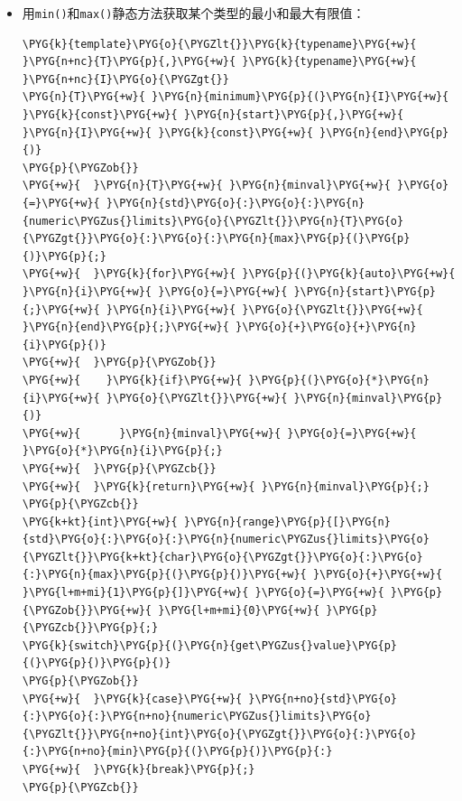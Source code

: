 
\begin{itemize}
\item 用\texttt{min()}和\texttt{max()}静态方法获取某个类型的最小和最大有限值：



\begin{codeblockbg}
\begin{Verbatim}[commandchars=\\\{\},breaklines=true,breakanywhere=true,fontsize=\codefont,xleftmargin=17bp]
\PYG{k}{template}\PYG{o}{\PYGZlt{}}\PYG{k}{typename}\PYG{+w}{ }\PYG{n+nc}{T}\PYG{p}{,}\PYG{+w}{ }\PYG{k}{typename}\PYG{+w}{ }\PYG{n+nc}{I}\PYG{o}{\PYGZgt{}}
\PYG{n}{T}\PYG{+w}{ }\PYG{n}{minimum}\PYG{p}{(}\PYG{n}{I}\PYG{+w}{ }\PYG{k}{const}\PYG{+w}{ }\PYG{n}{start}\PYG{p}{,}\PYG{+w}{ }\PYG{n}{I}\PYG{+w}{ }\PYG{k}{const}\PYG{+w}{ }\PYG{n}{end}\PYG{p}{)}
\PYG{p}{\PYGZob{}}
\PYG{+w}{  }\PYG{n}{T}\PYG{+w}{ }\PYG{n}{minval}\PYG{+w}{ }\PYG{o}{=}\PYG{+w}{ }\PYG{n}{std}\PYG{o}{:}\PYG{o}{:}\PYG{n}{numeric\PYGZus{}limits}\PYG{o}{\PYGZlt{}}\PYG{n}{T}\PYG{o}{\PYGZgt{}}\PYG{o}{:}\PYG{o}{:}\PYG{n}{max}\PYG{p}{(}\PYG{p}{)}\PYG{p}{;}
\PYG{+w}{  }\PYG{k}{for}\PYG{+w}{ }\PYG{p}{(}\PYG{k}{auto}\PYG{+w}{ }\PYG{n}{i}\PYG{+w}{ }\PYG{o}{=}\PYG{+w}{ }\PYG{n}{start}\PYG{p}{;}\PYG{+w}{ }\PYG{n}{i}\PYG{+w}{ }\PYG{o}{\PYGZlt{}}\PYG{+w}{ }\PYG{n}{end}\PYG{p}{;}\PYG{+w}{ }\PYG{o}{+}\PYG{o}{+}\PYG{n}{i}\PYG{p}{)}
\PYG{+w}{  }\PYG{p}{\PYGZob{}}
\PYG{+w}{    }\PYG{k}{if}\PYG{+w}{ }\PYG{p}{(}\PYG{o}{*}\PYG{n}{i}\PYG{+w}{ }\PYG{o}{\PYGZlt{}}\PYG{+w}{ }\PYG{n}{minval}\PYG{p}{)}
\PYG{+w}{      }\PYG{n}{minval}\PYG{+w}{ }\PYG{o}{=}\PYG{+w}{ }\PYG{o}{*}\PYG{n}{i}\PYG{p}{;}
\PYG{+w}{  }\PYG{p}{\PYGZcb{}}
\PYG{+w}{  }\PYG{k}{return}\PYG{+w}{ }\PYG{n}{minval}\PYG{p}{;}
\PYG{p}{\PYGZcb{}}
\PYG{k+kt}{int}\PYG{+w}{ }\PYG{n}{range}\PYG{p}{[}\PYG{n}{std}\PYG{o}{:}\PYG{o}{:}\PYG{n}{numeric\PYGZus{}limits}\PYG{o}{\PYGZlt{}}\PYG{k+kt}{char}\PYG{o}{\PYGZgt{}}\PYG{o}{:}\PYG{o}{:}\PYG{n}{max}\PYG{p}{(}\PYG{p}{)}\PYG{+w}{ }\PYG{o}{+}\PYG{+w}{ }\PYG{l+m+mi}{1}\PYG{p}{]}\PYG{+w}{ }\PYG{o}{=}\PYG{+w}{ }\PYG{p}{\PYGZob{}}\PYG{+w}{ }\PYG{l+m+mi}{0}\PYG{+w}{ }\PYG{p}{\PYGZcb{}}\PYG{p}{;}
\PYG{k}{switch}\PYG{p}{(}\PYG{n}{get\PYGZus{}value}\PYG{p}{(}\PYG{p}{)}\PYG{p}{)}
\PYG{p}{\PYGZob{}}
\PYG{+w}{  }\PYG{k}{case}\PYG{+w}{ }\PYG{n+no}{std}\PYG{o}{:}\PYG{o}{:}\PYG{n+no}{numeric\PYGZus{}limits}\PYG{o}{\PYGZlt{}}\PYG{n+no}{int}\PYG{o}{\PYGZgt{}}\PYG{o}{:}\PYG{o}{:}\PYG{n+no}{min}\PYG{p}{(}\PYG{p}{)}\PYG{p}{:}
\PYG{+w}{  }\PYG{k}{break}\PYG{p}{;}
\PYG{p}{\PYGZcb{}}
\end{Verbatim}
\end{codeblockbg}



\end{itemize}

